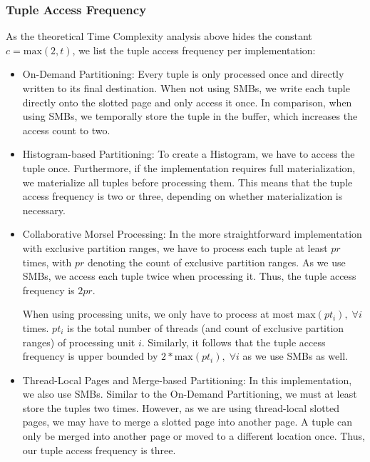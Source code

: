 \subsubsection{Tuple Access Frequency}
As the theoretical Time Complexity analysis above hides the constant $c = \textrm{max}(2, t)$, we list the tuple access frequency per implementation:
\begin{itemize}
  \item On-Demand Partitioning: Every tuple is only processed once and directly written to its final destination.
        When not using \acp{SMB}, we write each tuple directly onto the slotted page and only access it once.
        In comparison, when using \acp{SMB}, we temporally store the tuple in the buffer, which increases the access count to two.
  \item Histogram-based Partitioning: To create a Histogram, we have to access the tuple once.
        Furthermore, if the implementation requires full materialization, we materialize all tuples before processing them.
        This means that the tuple access frequency is two or three, depending on whether materialization is necessary.

  \item Collaborative Morsel Processing: In the more straightforward implementation with exclusive partition ranges, we have to process each tuple at least $pr$ times, with $pr$ denoting the count of exclusive partition ranges.
        As we use \acp{SMB}, we access each tuple twice when processing it.
        Thus, the tuple access frequency is $2pr$.

        When using processing units, we only have to process at most $\textrm{max}(pt_i), \; \forall i$ times.
        $pt_i$ is the total number of threads (and count of exclusive partition ranges) of processing unit $i$.
        Similarly, it follows that the tuple access frequency is upper bounded by $2 * \textrm{max}(pt_i), \; \forall i$ as we use \acp{SMB} as well.

  \item Thread-Local Pages and Merge-based Partitioning: In this implementation, we also use \acp{SMB}.
        Similar to the On-Demand Partitioning, we must at least store the tuples two times.
        However, as we are using thread-local slotted pages, we may have to merge a slotted page into another page.
        A tuple can only be merged into another page or moved to a different location once.
        Thus, our tuple access frequency is three.
\end{itemize}
